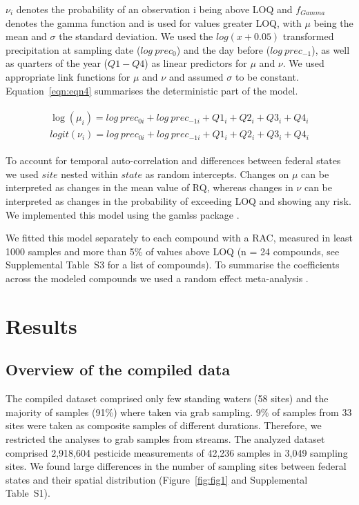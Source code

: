 \documentclass[journal=esthag,manuscript=article]{achemso}
\begin{document}
$\nu_i$ denotes the probability of an observation i being above LOQ and $f_{Gamma}$ denotes the gamma function and is used for values greater LOQ, with $\mu$ being the mean and $\sigma$ the standard deviation.
We used the $log(x+0.05)$ transformed precipitation at sampling date ($log~prec_0$) and the day before ($log~prec_{-1}$), as well as quarters of the year ($Q1-Q4$) as linear predictors for $\mu$ and $\nu$. 
We used appropriate link functions for $\mu$ and $\nu$ and assumed $\sigma$ to be constant. 
Equation~\ref{eqn:eqn4} summarises the deterministic part of the model.

\begin{align}
\begin{split}
\log(\mu_{i}) = log~prec_{0 i} + log~prec_{-1 i} + Q1_{i} + Q2_{i}+Q3_{i}+Q4_{i}\\
logit(\nu_{i}) = log~prec_{0 i} + log~prec_{-1 i} + Q1_{i} + Q2_{i}+Q3_{i}+Q4_{i}
\end{split}
\label{eqn:eqn4}
\end{align}

To account for temporal auto-correlation and differences between federal states we used $site$ nested within $state$ as random intercepts.
Changes on $\mu$ can be interpreted as changes in the mean value of RQ, whereas changes in $\nu$ can be interpreted as changes in the probability of exceeding LOQ and showing any risk. 
We implemented this model using the gamlss package \cite{stasinopoulos_generalized_2007}.

We fitted this model separately to each compound with a RAC, measured in least 1000 samples and more than 5\% of values above LOQ (n = 24 compounds, see Supplemental Table~S3 for a list of compounds). 
To summarise the coefficients across the modeled compounds we used a random effect meta-analysis \citep{harrison_getting_2011}.




\section{Results}
\subsection{Overview of the compiled data}

The compiled dataset comprised only few standing waters (58 sites) and the majority of samples (91\%) where taken via grab sampling.  %
9\% of samples from 33 sites were taken as composite samples of different durations.
Therefore, we restricted the analyses to grab samples from streams. 
The analyzed dataset comprised 2,918,604 pesticide measurements of 42,236 samples in 3,049 sampling sites.  %
We found large differences in the number of sampling sites between federal states and their spatial distribution (Figure~\ref{fig:fig1} and Supplemental Table~S1).
\end{document}

